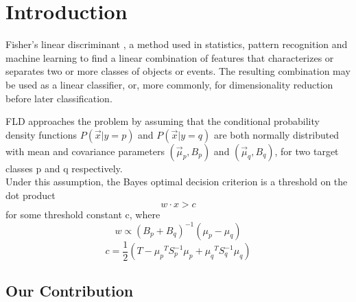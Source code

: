 \documentclass[11pt,twocolumn,varwidth=true,a4paper,fleqn]{article}
\begin{document}
\section{Introduction}
\par Fisher's linear discriminant \cite{fisher1936use}, a method used in statistics, 
pattern recognition and machine learning to find a linear combination of features 
that characterizes or separates two or more classes of objects or events. 
The resulting combination may be used as a linear classifier, or, 
more commonly, for dimensionality reduction before later classification.
\\\par FLD approaches the problem by assuming that the conditional probability density functions $P(\vec x|y=p)$ and $P(\vec x|y=q)$ are both normally distributed with mean and covariance parameters $\left(\vec \mu_p, B_p\right)$ and $\left(\vec \mu_q, B_q\right)$, for two target classes p and q respectively.
\\Under this assumption, the Bayes optimal decision criterion is a threshold on the dot product
\begin{equation*} \label{eq:decision}
w \cdot x > c
\end{equation*}
for some threshold constant c, where
\begin{equation} \label{eq:w}
w \propto (B_p+B_q)^{-1}(\mu_p - \mu_q)
\end{equation}
\begin{equation} \label{eq:c}
c = \frac{1}{2}(T-{\mu_p}^T S_p^{-1} {\mu_p}+{\mu_q}^T S_q^{-1} {\mu_q})
\end{equation}
\subsection{Our Contribution}
\end{document}
